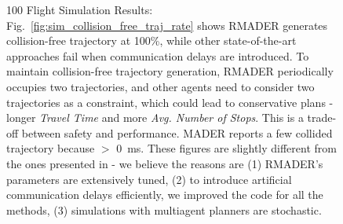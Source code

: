 \begin{figure}[tp]
    \qquad
    
    \caption[100 flight simulation results]{100 Flight Simulation Results: Fig.~\ref{fig:sim_collision_free_traj_rate} shows RMADER generates collision-free trajectory at 100\%, while other state-of-the-art approaches fail when communication delays are introduced. 
    To maintain collision-free trajectory generation, RMADER periodically occupies two trajectories, and other agents need to consider two trajectories as a constraint, which could lead to conservative plans - longer \emph{Travel Time} and more \emph{Avg. Number of Stops}. 
    This is a trade-off between safety and performance. MADER reports a few collided trajectory because \delayActual{} $>$ \SI{0}{\ms}. These figures are slightly different from the ones presented in \cite{kondo2022robust} - we believe the reasons are (1) RMADER's parameters are extensively tuned, (2) to introduce artificial communication delays efficiently, we improved the code for all the methods, (3) simulations with multiagent planners are stochastic.} 
    \label{fig:sim_simulation_summary}
\end{figure}

